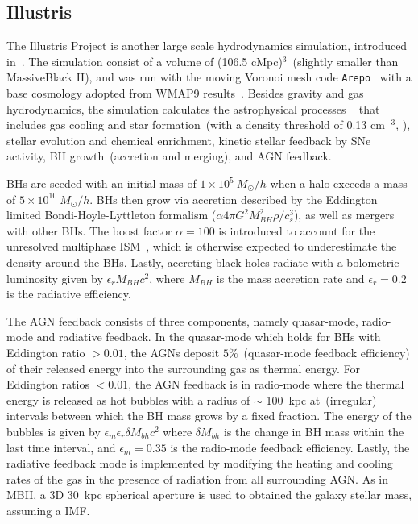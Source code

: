 \documentclass[twocolumn]{aastex631}
\begin{document}
\subsection{Illustris}
The Illustris Project is another large scale hydrodynamics simulation, introduced in~\citet{2014MNRAS.444.1518V, 2014Natur.509..177V}. The simulation consist of a volume of (106.5 cMpc)$^3$~(slightly smaller than MassiveBlack II), 
and was run with the moving Voronoi mesh code {\tt Arepo}~\citep{2010MNRAS.401..791S} with a base cosmology adopted from WMAP9 results~\citep{2013ApJS..208...19H}. Besides gravity and gas hydrodynamics, the simulation calculates the astrophysical processes ~\citep{2013MNRAS.436.3031V, 2014MNRAS.438.1985T} that includes gas cooling and star formation~(with a density threshold of 0.13 cm$^{-3}$, \citealt{2003MNRAS.339..289S}), stellar evolution and chemical enrichment, kinetic stellar feedback by SNe activity, BH growth~(accretion and merging), and AGN feedback.

BHs are seeded with an initial mass of $1 \times 10^5~M_{\odot}/h$ when a halo exceeds a mass of $5 \times 10^{10}~M_{\odot}/h$. BHs then grow via accretion described by the Eddington limited Bondi-Hoyle-Lyttleton formalism ($\alpha4\pi G^2M_{BH}^2 \rho/c_s^3$), as well as mergers with other BHs. The boost factor $\alpha=100$ is introduced to account for the unresolved multiphase ISM~\citep{Springel2005, 2009MNRAS.398...53B}, which is otherwise expected to underestimate the density around the BHs. Lastly, accreting black holes radiate with a bolometric luminosity given by $\epsilon_r \dot{M}_{BH}c^2$, where $\dot{M}_{BH}$ is the mass accretion rate and $\epsilon_r=0.2$ is the radiative efficiency.

The AGN feedback consists of three components, namely quasar-mode, radio-mode and radiative feedback. In the quasar-mode which holds for BHs with Eddington ratio $>0.01$, the AGNs deposit $5\%$~(quasar-mode feedback efficiency) of their released energy into the surrounding gas as thermal energy. For Eddington ratios $<0.01$, the AGN feedback is in radio-mode where the thermal energy is released as hot bubbles with a radius of $\sim$ 100~kpc at~(irregular) intervals between which the BH mass grows by a fixed fraction. The energy of the bubbles is given by $\epsilon_m \epsilon_r \delta M_{bh} c^2$ where $\delta M_{bh}$ is the change in BH mass within the last time interval, and $\epsilon_m=0.35$ is the radio-mode feedback efficiency. Lastly, the radiative feedback mode is implemented by modifying the heating and cooling rates of the gas in the presence of radiation from all surrounding AGN. As in MBII, a 3D 30~kpc spherical aperture is used to obtained the galaxy stellar mass, assuming a \cite{2003PASP..115..763C} IMF.
\end{document}
